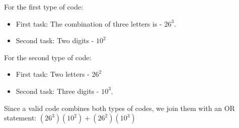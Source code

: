 \documentclass{article}
\begin{document}
For the first type of code:

\begin{itemize}
  \item First task: The combination of three letters is - $26^3$.
  \item Second task: Two digits - $10^2$
\end{itemize}

For the second type of code:

\begin{itemize}
  \item First task: Two letters - $26^2$
  \item Second task: Three digits - $10^3$.
\end{itemize}

Since a valid code combines both types of codes, we join them with an OR statement:  $(26^3)(10^2) + (26^2)(10^3)$
\end{document}
